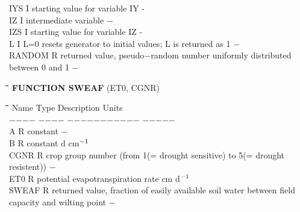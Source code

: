 \documentclass[11pt]{article}
\begin{document}
\begin{tabbing}
IYS\> \> I\> starting value for variable IY\> \> \> \> \> \> \> - \\
IZ      \> \> I   \> intermediate variable                              \> \> \> \> \> \> \> $-$\\
IZS\> \> I\> starting value for variable IZ\> \> \> \> \> \> \> -\\
L       \> \> I   \> L=0 resets generator to initial values; L is returned as 1                     \> \> \> \> \> \> \> $-$\\
RANDOM  \> \> R   \> returned value, pseudo$-$random number uniformly distributed between 0 and 1\> \> \> \> \> \> \> $-$
\end{tabbing}

\bigskip
\nwln
\begin{tabbing}
\hspace{1.27cm}\=\hspace{1.27cm}\=\hspace{1.27cm}\=\hspace{1.27cm}\=%
\hspace{1.27cm}\=\hspace{1.27cm}\=\hspace{1.27cm}\=\hspace{1.27cm}\=%
\hspace{1.27cm}\=\hspace{1.27cm}\=\kill
{\bf FUNCTION SWEAF}\> \> \> (ET0, CGNR)
\end{tabbing}
\nwln
\begin{tabbing}
\hspace{1.27cm}\=\hspace{1.27cm}\=\hspace{1.27cm}\=\hspace{1.27cm}\=%
\hspace{1.27cm}\=\hspace{1.27cm}\=\hspace{1.27cm}\=\hspace{1.27cm}\=%
\hspace{1.27cm}\=\hspace{1.27cm}\=\kill
Name    \> \> Type   \> Description                                        \> \> \> \> \> \> \> Units\\
$-$$-$$-$$-$    \> \> $-$$-$$-$$-$   \> $-$$-$$-$$-$$-$$-$$-$$-$$-$$-$$-$                                        \> \> \> \> \> \> \> $-$$-$$-$$-$$-$\\
A       \> \> R   \> constant                                           \> \> \> \> \> \> \> $-$\\
B       \> \> R   \> constant                                           \> \> \> \> \> \> \> d cm$^{{\rm -1}}$\\
CGNR    \> \> R   \> crop group number (from 1(= drought sensitive) to 5(= drought resistent))   \> \> \> \> \> \> \> $-$  \\
ET0     \> \> R   \> potential evapotranspiration rate                  \> \> \> \> \> \> \> cm d$^{{\rm -1}}$ \\
SWEAF   \> \> R   \> returned value, fraction of easily available soil water between field \\
\>\> \> capacity and wilting point                                      \> \> \> \> \> \> \> $-$
\end{tabbing}
\end{document}
